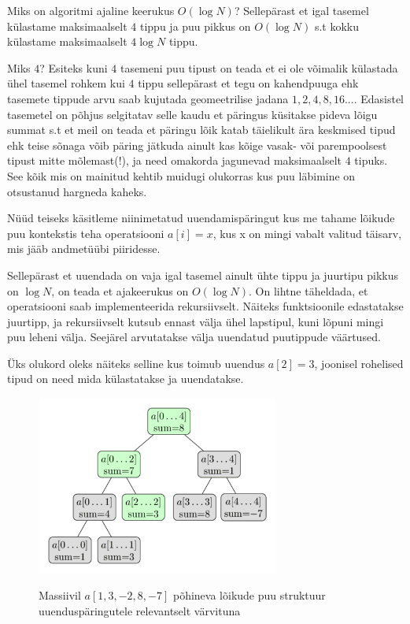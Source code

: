 \documentclass{trkut}
\theoremstyle{definition}
\begin{document}
Miks on algoritmi ajaline keerukus $O(\log N)$? Sellepärast et igal tasemel külastame maksimaalselt $4$ tippu ja puu pikkus on $O(\log N)$ s.t kokku külastame maksimaalselt $4\log N$ tippu. \parencite{EMaxx}

Miks $4$? Esiteks kuni $4$ tasemeni puu tipust on teada et ei ole võimalik külastada ühel tasemel rohkem kui $4$ tippu sellepärast et tegu on kahendpuuga ehk tasemete tippude arvu saab kujutada geomeetrilise jadana ${1, 2, 4, 8, 16...}$. Edasistel tasemetel on põhjus selgitatav selle kaudu et päringus küsitakse pideva lõigu summat s.t et meil on teada et päringu lõik katab täielikult ära keskmised tipud ehk teise sõnaga võib päring jätkuda ainult kas kõige vasak- või parempoolsest tipust mitte mõlemast(!), ja need omakorda jagunevad maksimaalselt $4$ tipuks. See kõik mis on mainitud kehtib muidugi olukorras kus puu läbimine on otsustanud hargneda kaheks. \parencite{EMaxx}

Nüüd teiseks käsitleme niinimetatud uuendamispäringut kus me tahame lõikude puu kontekstis teha operatsiooni $a[i]=x$, kus x on mingi vabalt valitud täisarv, mis jääb andmetüübi piiridesse. \parencite{EMaxx}

Sellepärast et uuendada on vaja igal tasemel ainult ühte tippu ja juurtipu pikkus on $\log N$, on teada et ajakeerukus on $O(\log N)$.
On lihtne täheldada, et operatsiooni saab implementeerida rekursiivselt. Näiteks funktsioonile edastatakse juurtipp, ja rekursiivselt kutsub ennast välja ühel lapstipul, kuni lõpuni mingi puu leheni välja. Seejärel arvutatakse välja uuendatud puutippude väärtused. \parencite{EMaxx}


Üks olukord oleks näiteks selline kus toimub uuendus $a[2]=3$, joonisel rohelised tipud on need mida külastatakse ja uuendatakse.

\begin{figure}[H]%
    \includegraphics[width=8cm]{ULPUU.png}%
    \caption{Massiivil $a[1,3,-2,8,-7]$ põhineva lõikude puu struktuur uuenduspäringutele relevantselt värvituna}%
    \label{EMaxx}%
\end{figure}
\end{document}
